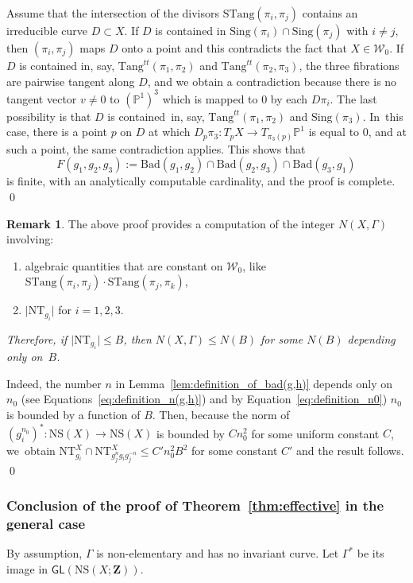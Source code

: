 \documentclass[JEP,XML,SOM,Unicode,published]{cedram}
\newcommand{\pp}{\mathbb{P}}\let\P\pp
\def\Z{\mathbf{Z}}
\newcommand{\cW}{\mathcal{W}}
\newcommand{\NS}{{\mathrm{NS}}}
\newcommand{\Sing}{{\mathrm{Sing}}}
\newcommand{\Tang}{{\mathrm{Tang}}}
\newcommand{\STang}{{\mathrm{STang}}}
\newcommand{\NT}{{\mathrm{NT}}}
\newcommand\GL{{\mathsf{GL}}}
\theoremstyle{plain}
\theoremstyle{definition}
\newtheorem{rem}[thm]{Remark}
\begin{document}
Assume that the intersection of the divisors $\STang(\pi_i, \pi_j)$ contains an irreducible curve $D\subset X$. If $D$ is contained in $\Sing(\pi_i)\cap \Sing(\pi_j)$ with $i\neq j$, then $(\pi_i, \pi_j)$ maps $D$ onto a point and this contradicts the fact that $X\in { \cW}_0$. If $D$ is contained in, say, $\Tang^{tt}(\pi_1,\pi_2)$
and $\Tang^{tt}(\pi_2, \pi_3)$, the three fibrations are pairwise tangent along $D$, and we obtain a contradiction because there is no tangent vector $v\neq 0$ to $(\pp^1)^3$ which is mapped to $0$ by each $D\pi_i$. The last possibility is that $D$ is contained~in, say, $\Tang^{tt}(\pi_1,\pi_2)$ and $\Sing(\pi_3)$. In~this case, there is a point $p$ on $D$ at which $D_p\pi_3\colon T_pX\to T_{\pi_3(p)}\P^1$ is equal to $0$, and
at such a point, the same contradiction applies. This shows that
\begin{equation}\label{eq:finite-bad-set}
F(g_1,g_2,g_3):=\mathrm{Bad}(g_1,g_2)\cap \mathrm{Bad}(g_2,g_3)\cap \mathrm{Bad}(g_3,g_1)
\end{equation}
is finite, with an analytically computable cardinality, and the proof is complete. \qed

\begin{rem}\label{rem:N(X)}
The above proof provides a computation of the integer $N(X, \Gamma)$ involving:
\begin{enumerate}
\item\label{rem:N(X)1} algebraic quantities that are constant on $\cW_0$, like $\STang(\pi_i,\pi_j)\cdot \STang(\pi_j,\pi_k)$,
\item\label{rem:N(X)2} $\vert \mathrm{NT}_{g_i}\vert$ for
$i=1, 2, 3$.
\end{enumerate}
{\textit{Therefore, if $\vert \mathrm{NT}_{g_i}\vert \leq B$, then $N(X,\Gamma)\leq N(B)$ for some $N(B)$ depending only on~$B$.}}

Indeed, the number $n$ in Lemma~\ref{lem:definition_of_bad(g,h)} depends only on $n_0$ (see Equations~\eqref{eq:definition_n(g,h)}) and by Equation~\eqref{eq:definition_n0}) $n_0$ is bounded by a function of $B$.
Then, because the norm of $(g_i^{n_0})^*\colon \NS(X)\to \NS(X)$ is bounded by $Cn_0^2$ for some uniform constant $C$, we~obtain
$\NT_{g_i}^X \cap \NT_{g_j^ng_ig_j^{-n}}^X\leq C' n_0^2 B^2$
for some constant $C'$ and the result follows. \qed
\end{rem}

\subsubsection*{Conclusion of the proof of Theorem~\ref{thm:effective} in the general case}%
By assumption, $\Gamma$ is non-elementary and has no invariant curve. Let $\Gamma^*$ be its image in $\GL(\NS(X;\Z))$.
\end{document}
